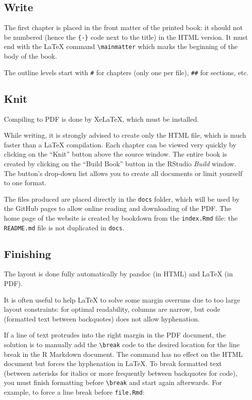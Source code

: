 \documentclass[
  12pt,
  american,
  a4paper,
  extrafontsizes,onecolumn,openright
  ]{memoir}
\begin{document}
\hypertarget{write-1}{%
\subsection{Write}\label{write-1}}

The first chapter is placed in the front matter of the printed book: it should not be numbered (hence the \texttt{\{-\}} code next to the title) in the HTML version.
It must end with the LaTeX command \texttt{\textbackslash{}mainmatter} which marks the beginning of the body of the book.

The outline levels start with \texttt{\#} for chapters (only one per file), \texttt{\#\#} for sections, etc.

\hypertarget{knit-1}{%
\subsection{Knit}\label{knit-1}}

Compiling to PDF is done by XeLaTeX, which must be installed.

While writing, it is strongly advised to create only the HTML file, which is much faster than a LaTeX compilation.
Each chapter can be viewed very quickly by clicking on the \enquote{Knit} button above the source window.
The entire book is created by clicking on the \enquote{Build Book} button in the RStudio \emph{Build} window.
The button's drop-down list allows you to create all documents or limit yourself to one format.

The files produced are placed directly in the \texttt{docs} folder, which will be used by the GitHub pages to allow online reading and downloading of the PDF.
The home page of the website is created by bookdown from the \texttt{index.Rmd} file: the \texttt{README.md} file is not duplicated in \texttt{docs}.

\hypertarget{finishing}{%
\subsection{Finishing}\label{finishing}}

The layout is done fully automatically by pandoc (in HTML) and LaTeX (in PDF).

It is often useful to help LaTeX to solve some margin overruns due to too large layout constraints: for optimal readability, columns are narrow, but code (formatted text between backquotes) does not allow hyphenation.

If a line of text protrudes into the right margin in the PDF document, the solution is to manually add the \texttt{\textbackslash{}break} code to the desired location for the line break in the R Markdown document.
The command has no effect on the HTML document but forces the hyphenation in LaTeX.
To break formatted text (between asterisks for italics or more frequently between backquotes for code), you must finish formatting before \texttt{\textbackslash{}break} and start again afterwards.
For example, to force a line break before \texttt{file.Rmd}:
\end{document}
